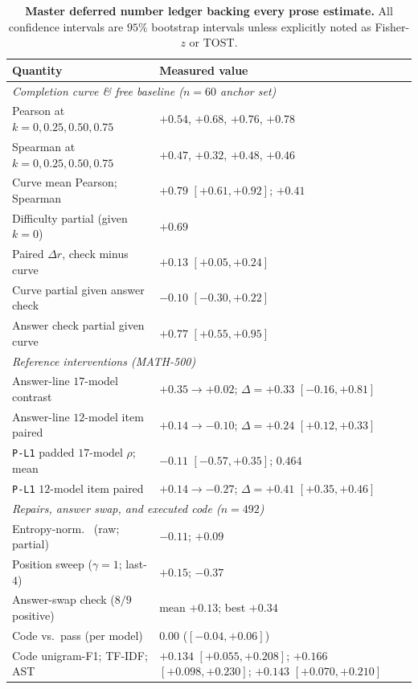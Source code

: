 \begin{table}[t]
\centering
\caption{\textbf{Master deferred number ledger backing every prose estimate.} All confidence intervals are $95\%$ bootstrap intervals unless explicitly noted as Fisher-$z$ or TOST.}
\label{tab:supp-deferred}
\scriptsize
\setlength{\tabcolsep}{4pt}
\begin{tabular}{@{}ll@{}}
\toprule
Quantity & Measured value \\
\midrule
\multicolumn{2}{l}{\emph{Completion curve \& free baseline ($n{=}60$ anchor set)}} \\
\quad Pearson at $k = 0, 0.25, 0.50, 0.75$ & $+0.54$, $+0.68$, $+0.76$, $+0.78$ \\
\quad Spearman at $k = 0, 0.25, 0.50, 0.75$ & $+0.47$, $+0.32$, $+0.48$, $+0.46$ \\
\quad Curve mean Pearson; Spearman & $+0.79$ $[+0.61, +0.92]$; $+0.41$ \\
\quad Difficulty partial (given $k{=}0$) & $+0.69$ \\
\quad Paired $\Delta r$, check minus curve & $+0.13$ $[+0.05, +0.24]$ \\
\quad Curve partial given answer check & $-0.10$ $[-0.30, +0.22]$ \\
\quad Answer check partial given curve & $+0.77$ $[+0.55, +0.95]$ \\
\midrule
\multicolumn{2}{l}{\emph{Reference interventions (\textsc{MATH-500})}} \\
\quad Answer-line $17$-model contrast & $+0.35 \to +0.02$; $\Delta = +0.33$ $[-0.16, +0.81]$ \\
\quad Answer-line $12$-model item paired & $+0.14 \to -0.10$; $\Delta = +0.24$ $[+0.12, +0.33]$ \\
\quad \texttt{P-L1} padded $17$-model $\rho$; mean \tfa{} & $-0.11$ $[-0.57, +0.35]$; $0.464$ \\
\quad \texttt{P-L1} $12$-model item paired & $+0.14 \to -0.27$; $\Delta = +0.41$ $[+0.35, +0.46]$ \\
\midrule
\multicolumn{2}{l}{\emph{Repairs, answer swap, and executed code ($n{=}492$)}} \\
\quad Entropy-norm.\ \tfa{} (raw; partial) & $-0.11$; $+0.09$ \\
\quad Position sweep ($\gamma{=}1$; last-$4$) & $+0.15$; $-0.37$ \\
\quad Answer-swap check ($8/9$ positive) & mean $+0.13$; best $+0.34$ \\
\quad Code \tfa{} vs.\ pass (per model) & $0.00$ ($[-0.04, +0.06]$) \\
\quad Code unigram-F1; TF-IDF; AST & $+0.134$ $[+0.055, +0.208]$; $+0.166$ $[+0.098, +0.230]$; $+0.143$ $[+0.070, +0.210]$ \\
\bottomrule
\end{tabular}
\end{table}


